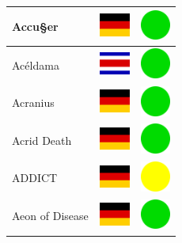 \documentclass[12pt, a4paper, twoside]{report}
\begin{document}
\begin{center}
\begin{longtable}{|p{5cm}|p{2cm}|p{2cm}|}
 Accu§er                                                    & \includegraphics[width=1cm]{../img/flags/de} &   \includegraphics[width=1cm]{../likes/y} \\ \hline
 Acéldama                                                   & \includegraphics[width=1cm]{../img/flags/cr} &   \includegraphics[width=1cm]{../likes/y} \\ \hline
 Acranius                                                   & \includegraphics[width=1cm]{../img/flags/de} &   \includegraphics[width=1cm]{../likes/y} \\ \hline
 Acrid Death                                                & \includegraphics[width=1cm]{../img/flags/de} &   \includegraphics[width=1cm]{../likes/y} \\ \hline
 ADDICT                                                     & \includegraphics[width=1cm]{../img/flags/de} &   \includegraphics[width=1cm]{../likes/m} \\ \hline
 Aeon of Disease                                            & \includegraphics[width=1cm]{../img/flags/de} &   \includegraphics[width=1cm]{../likes/y} \\ \hline

\end{longtable}
\end{center}
\end{document}
